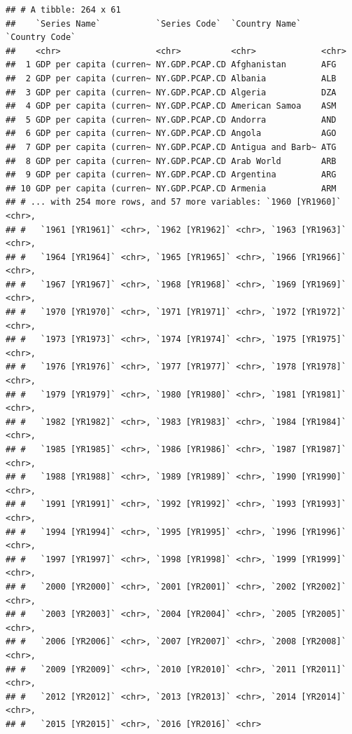 \documentclass[12pt,]{article}
\begin{document}
\begin{verbatim}
## # A tibble: 264 x 61
##    `Series Name`           `Series Code`  `Country Name`    `Country Code`
##    <chr>                   <chr>          <chr>             <chr>         
##  1 GDP per capita (curren~ NY.GDP.PCAP.CD Afghanistan       AFG           
##  2 GDP per capita (curren~ NY.GDP.PCAP.CD Albania           ALB           
##  3 GDP per capita (curren~ NY.GDP.PCAP.CD Algeria           DZA           
##  4 GDP per capita (curren~ NY.GDP.PCAP.CD American Samoa    ASM           
##  5 GDP per capita (curren~ NY.GDP.PCAP.CD Andorra           AND           
##  6 GDP per capita (curren~ NY.GDP.PCAP.CD Angola            AGO           
##  7 GDP per capita (curren~ NY.GDP.PCAP.CD Antigua and Barb~ ATG           
##  8 GDP per capita (curren~ NY.GDP.PCAP.CD Arab World        ARB           
##  9 GDP per capita (curren~ NY.GDP.PCAP.CD Argentina         ARG           
## 10 GDP per capita (curren~ NY.GDP.PCAP.CD Armenia           ARM           
## # ... with 254 more rows, and 57 more variables: `1960 [YR1960]` <chr>,
## #   `1961 [YR1961]` <chr>, `1962 [YR1962]` <chr>, `1963 [YR1963]` <chr>,
## #   `1964 [YR1964]` <chr>, `1965 [YR1965]` <chr>, `1966 [YR1966]` <chr>,
## #   `1967 [YR1967]` <chr>, `1968 [YR1968]` <chr>, `1969 [YR1969]` <chr>,
## #   `1970 [YR1970]` <chr>, `1971 [YR1971]` <chr>, `1972 [YR1972]` <chr>,
## #   `1973 [YR1973]` <chr>, `1974 [YR1974]` <chr>, `1975 [YR1975]` <chr>,
## #   `1976 [YR1976]` <chr>, `1977 [YR1977]` <chr>, `1978 [YR1978]` <chr>,
## #   `1979 [YR1979]` <chr>, `1980 [YR1980]` <chr>, `1981 [YR1981]` <chr>,
## #   `1982 [YR1982]` <chr>, `1983 [YR1983]` <chr>, `1984 [YR1984]` <chr>,
## #   `1985 [YR1985]` <chr>, `1986 [YR1986]` <chr>, `1987 [YR1987]` <chr>,
## #   `1988 [YR1988]` <chr>, `1989 [YR1989]` <chr>, `1990 [YR1990]` <chr>,
## #   `1991 [YR1991]` <chr>, `1992 [YR1992]` <chr>, `1993 [YR1993]` <chr>,
## #   `1994 [YR1994]` <chr>, `1995 [YR1995]` <chr>, `1996 [YR1996]` <chr>,
## #   `1997 [YR1997]` <chr>, `1998 [YR1998]` <chr>, `1999 [YR1999]` <chr>,
## #   `2000 [YR2000]` <chr>, `2001 [YR2001]` <chr>, `2002 [YR2002]` <chr>,
## #   `2003 [YR2003]` <chr>, `2004 [YR2004]` <chr>, `2005 [YR2005]` <chr>,
## #   `2006 [YR2006]` <chr>, `2007 [YR2007]` <chr>, `2008 [YR2008]` <chr>,
## #   `2009 [YR2009]` <chr>, `2010 [YR2010]` <chr>, `2011 [YR2011]` <chr>,
## #   `2012 [YR2012]` <chr>, `2013 [YR2013]` <chr>, `2014 [YR2014]` <chr>,
## #   `2015 [YR2015]` <chr>, `2016 [YR2016]` <chr>
\end{verbatim}
\end{document}
